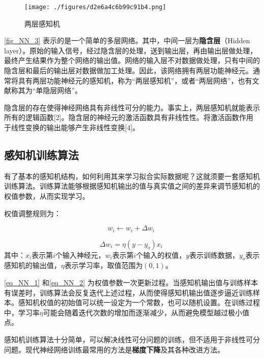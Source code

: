 
\begin{figure}[ht]
\centering
\texttt{[image: ./figures/d2e6a4c6b99c91b4.png]}
\caption{两层感知机} \label{fig_NN_3}
\end{figure}
\autoref{fig_NN_3} 表示的是一个简单的多层网络。其中，中间一层为\textbf{隐含层}（Hidden layer）。原始的输入信号，经过隐含层的处理，送到输出层，再由输出层做处理，最终产生结果作为整个网络的输出值。网络的输入层不对数据做处理，只有中间的隐含层和最后的输出层对数据做加工处理。因此，该网络拥有两层功能神经元。通常将具有两层功能神经元的感知机，称为“两层感知机”，或者“两层网络”，也有文献称其为“单隐层网络”。

隐含层的存在使得神经网络具有非线性可分的能力。事实上，两层感知机就能表示所有的逻辑函数[2]。隐含层的神经元的激活函数具有非线性性。将激活函数作用于线性变换的输出能够产生非线性变换[4]。


\subsection{感知机训练算法}

有了基本的感知机结构，如何利用其来学习拟合实际数据呢？这就须要一套感知机训练算法。训练算法能够根据感知机输出的值与真实值之间的差异来调节感知机的权值参数，从而实现学习。

权值调整规则为：

\begin{equation}\label{eq_NN_1}
w_i \leftarrow w_i + \Delta w_i~
\end{equation}

\begin{equation}\label{eq_NN_2}
\Delta w_i = \eta(y-y_o)x_i~
\end{equation}
其中：$x_i$表示第$i$个输入神经元，$w_i$表示第$i$个输入的权值，$y$表示训练数据，$y_o$表示感知机的输出值，$\eta$表示学习率，取值范围为$(0,1)$。

\autoref{eq_NN_1} 和\autoref{eq_NN_2} 为权值参数一次更新过程。当感知机输出值与训练样本有误差时，训练算法会反复迭代上述过程，从而使得感知机输出值逐步逼近训练样本。感知机权值的初始值可以统一设定为一个常数，也可以随机设置。在训练过程中，学习率$\eta$可能会随着迭代次数的增加而逐渐减少，从而避免模型越过极小值点。

感知机训练算法十分简单，可以解决线性可分问题的训练，但不适用于非线性可分问题。现代神经网络训练最常用的方法是\textbf{梯度下降}及其各种改进方法。

